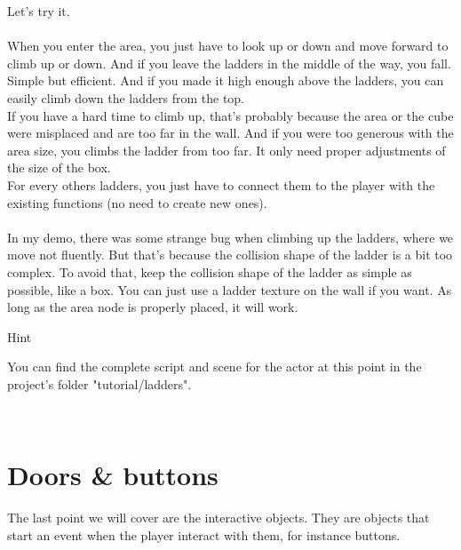 \documentclass[10pt,a4paper]{article}
\newenvironment{hint}{%
\begin{bclogo}[logo=\bcinfo, couleurBarre=Green, noborder=true, 
               couleur=white]{Hint}
}{%
\end{bclogo}\hspace{1px}\\
}
\begin{document}
Let's try it.\\
\\
When you enter the area, you just have to look up or down and move forward to climb up or down. And if you leave the ladders in the middle of the way, you fall. Simple but efficient. And if you made it high enough above the ladders, you can easily climb down the ladders from the top.\\
If you have a hard time to climb up, that's probably because the area or the cube were misplaced and are too far in the wall. And if you were too generous with the area size, you climbs the ladder from too far. It only need proper adjustments of the size of the box.\\
For every others ladders, you just have to connect them to the player with the existing functions (no need to create new ones).\\
\\
In my demo, there was some strange bug when climbing up the ladders, where we move not fluently. But that's because the collision shape of the ladder is a bit too complex. To avoid that, keep the collision shape of the ladder as simple as possible, like a box. You can just use a ladder texture on the wall if you want. As long as the area node is properly placed, it will work.

\begin{hint}
You can find the complete script and scene for the actor at this point in the project's folder "tutorial/ladders". 
\end{hint}

\section{Doors \& buttons}
The last point we will cover are the interactive objects. They are objects that start an event when the player interact with them, for instance buttons. 
\end{document}
